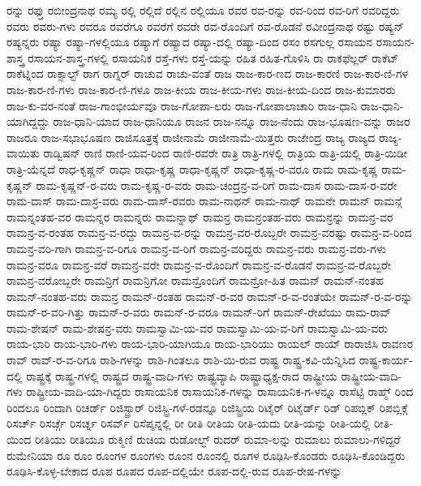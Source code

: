 {ರನ್ನು
ರಫ್ತು
ರಬೀಂದ್ರನಾಥ
ರಮ್ಯ
ರಲ್ಲಿ
ರಲ್ಲಿದೆ
ರಲ್ಲಿನ
ರಲ್ಲಿಯೂ
ರವರ
ರವ-ರನ್ನು
ರವ-ರಿಂದ
ರವ-ರಿಗೆ
ರವರಿದ್ದರು
ರವರು
ರವರು-ಗಳು
ರವರೂ
ರವರೆಗೂ
ರವರೆಗೆ
ರವರೇ
ರವ-ರೊಂದಿಗೆ
ರವ-ರೊಡನೆ
ರವೀಂದ್ರನಾಥ
ರಷ್ಟು
ರಷ್ಯನ್
ರಷ್ಯನ್ನರು
ರಷ್ಯಾ
ರಷ್ಯಾ-ಗಳಲ್ಲಿಯೂ
ರಷ್ಯಾಗೆ
ರಷ್ಯಾದ
ರಷ್ಯಾ-ದಲ್ಲಿ
ರಷ್ಯಾ-ದಿಂದ
ರಸಂ
ರಸಗುಲ್ಲ
ರಸಾಯನ
ರಸಾಯನ-ಶಾಸ್ತ್ರ
ರಸಾಯನ-ಶಾಸ್ತ್ರ-ಗಳಲ್ಲಿ
ರಸಾಯನಿಕ
ರಸ್ತೆ-ಗಳು
ರಸ್ತೆ-ಯನ್ನು
ರಹಿತ
ರಹಿತ-ಗೊಳಿಸಿ
ರಾ
ರಾಕಫೆಲ್ಲರ್
ರಾಕೆಟ್
ರಾಕೆಟ್ನಿಂದ
ರಾಕ್ಸಾಲ್ಟ್
ರಾಗ
ರಾಗ್ನರ್
ರಾಚುವ
ರಾಚು-ವಂತೆ
ರಾಜ
ರಾಜ-ಕಾರ-ಣದ
ರಾಜ-ಕಾರಣಿ
ರಾಜ-ಕಾರ-ಣಿ-ಗಳ
ರಾಜ-ಕಾರ-ಣಿ-ಗಳು
ರಾಜ-ಕಾರ-ಣಿ-ಗಳೂ
ರಾಜ-ಕೀಯ
ರಾಜ-ಕೀಯ-ಗಳು
ರಾಜ-ಕೀಯ-ದಿಂದ
ರಾಜ-ಕುಮಾರರು
ರಾಜ-ಕು-ವರ-ನಂತೆ
ರಾಜ-ಗಾಂಭೀರ್ಯವೂ
ರಾಜ-ಗೋಪಾ-ಲರು
ರಾಜ-ಗೋಪಾಲಾಚಾರಿ
ರಾಜ-ಧಾನಿ
ರಾಜ-ಧಾನಿ-ಯಾಗಿದ್ದದ್ದು
ರಾಜ-ಧಾನಿ-ಯಾದ
ರಾಜ-ಧಾನಿಯೂ
ರಾಜನ
ರಾಜ-ನನ್ನೂ
ರಾಜ-ನೆಂದು
ರಾಜ-ಭೂಷಣ-ವನ್ನು
ರಾಜರ
ರಾಜರೂ
ರಾಜ-ಸಭಾಭೂಷಣ
ರಾಜಿಸೂತ್ರಕ್ಕೆ
ರಾಜೀನಾಮೆ
ರಾಜೀನಾಮೆ-ಯಿತ್ತರು
ರಾಜೇಂದ್ರ
ರಾಜ್ಯ
ರಾಜ್ಯದ
ರಾಜ್ಯ-ವಾಯಿತು
ರಾಡ್ವಿಷನ್
ರಾಣಿ
ರಾಣಿ-ಯವ-ರಿಂದ
ರಾಣಿ-ರವರೇ
ರಾತ್ರಿ
ರಾತ್ರಿ-ಗಳಲ್ಲಿ
ರಾತ್ರಿಯ
ರಾತ್ರಿ-ಯಲ್ಲಿ
ರಾತ್ರಿ-ಯಿಡೀ
ರಾತ್ರಿ-ಯೆನ್ನದೆ
ರಾಧ-ಕೃಷ್ಣನ್
ರಾಧಾ
ರಾಧಾ-ಕೃಷ್ಣ
ರಾಧಾ-ಕೃಷ್ಣನ್
ರಾಧಾ-ಕೃಷ್ಣ-ರ-ವರೂ
ರಾಮ
ರಾಮ-ಕೃಷ್ಣ
ರಾಮ-ಕೃಷ್ಣನ್
ರಾಮ-ಕೃಷ್ಣನ್-ರ-ವರು
ರಾಮ-ಕೃಷ್ಣ-ರ-ವರು
ರಾಮ-ಚಂದ್ರನ್ರ-ವ-ರಿಗೆ
ರಾಮ-ದಾಸ
ರಾಮ-ದಾಸ-ರ-ವರೇ
ರಾಮ-ದಾಸ್
ರಾಮ-ದಾಸ್ರ-ವರು
ರಾಮ-ದಾಸ್-ರವರು
ರಾಮ-ನಾಥನ್
ರಾಮ-ನಾಥ್
ರಾಮನೇ
ರಾಮನ್
ರಾಮನ್ಗೆ
ರಾಮನ್ನಂತಹ-ವರ
ರಾಮನ್ನರ
ರಾಮನ್ನರು
ರಾಮನ್ನಾಥ್
ರಾಮನ್ರ
ರಾಮನ್ರಂತಹ-ವರು
ರಾಮನ್ರನ್ನು
ರಾಮನ್ರ-ವರ
ರಾಮನ್ರ-ವ-ರಂತಹ
ರಾಮನ್ರ-ವ-ರದ್ದು
ರಾಮನ್ರ-ವ-ರನ್ನು
ರಾಮನ್ರ-ವರ-ರೊಬ್ಬರೇ
ರಾಮನ್ರ-ವರಷ್ಟು
ರಾಮನ್ರ-ವ-ರಿಂದ
ರಾಮನ್ರ-ವರಿ-ಗಾಗಿ
ರಾಮನ್ರ-ವ-ರಿಗೂ
ರಾಮನ್ರ-ವ-ರಿಗೆ
ರಾಮನ್ರ-ವರಿದ್ದರು
ರಾಮನ್ರ-ವರು
ರಾಮನ್ರ-ವರು-ಗಳು
ರಾಮನ್ರ-ವರೂ
ರಾಮನ್ರ-ವರೆ
ರಾಮನ್ರ-ವರೇ
ರಾಮನ್ರ-ವ-ರೊಂದಿಗೆ
ರಾಮನ್ರ-ವ-ರೊಡನೆ
ರಾಮನ್ರ-ವ-ರೊಬ್ಬರೇ
ರಾಮನ್ರ-ವರೋಬ್ಬರೇ
ರಾಮನ್ರಿಗೆ
ರಾಮನ್ರಿಗೋ
ರಾಮನ್ರೊಂದಿಗೆ
ರಾಮನ್ರೋ-ಹಿತ
ರಾಮನ್
ರಾಮನ್-ನಂತಹ
ರಾಮನ್-ನಂತಹ-ವರು
ರಾಮನ್ರ
ರಾಮನ್-ರಂತಹ
ರಾಮನ್-ರ-ವರ
ರಾಮನ್-ರ-ವ-ರಂತೆಯೇ
ರಾಮನ್-ರ-ವ-ರನ್ನು
ರಾಮನ್-ರ-ವರಿ-ಗಿತ್ತು
ರಾಮನ್-ರ-ವರು
ರಾಮನ್-ರ-ವರೂ
ರಾಮನ್-ರಿಗೆ
ರಾಮನ್-ರೇಖೆಯು
ರಾಮ-ರಾವ್
ರಾಮ-ಶೇಷನ್
ರಾಮ-ಶೇಷನ್ರ-ವರು
ರಾಮಸ್ವಾಮಿ-ಯ-ವರ
ರಾಮಸ್ವಾಮಿ-ಯ-ವ-ರಿಗೆ
ರಾಮಸ್ವಾಮಿ-ಯ-ವರು
ರಾಯ-ಭಾರಿ
ರಾಯ-ಭಾರಿ-ಗಳು
ರಾಯ-ಭಾರಿ-ಯಾಗಿಯೂ
ರಾಯ-ಭಾರಿಯು
ರಾಯಲ್
ರಾಯ್
ರಾರಾಜಿಸಿ
ರಾವಣರ
ರಾವ್
ರಾವ್-ರ-ವ-ರಿಗೂ
ರಾಶಿ-ಗಳನ್ನು
ರಾಶಿ-ಗಿಂತಲೂ
ರಾಶಿ-ಯಿ-ರುವ
ರಾಷ್ಟ್ರ
ರಾಷ್ಟ್ರ-ಕವಿ-ಯೆನ್ನಿಸಿದ
ರಾಷ್ಟ್ರ-ಕಾರ್ಯ-ದಲ್ಲಿ
ರಾಷ್ಟ್ರಕ್ಕೆ
ರಾಷ್ಟ್ರ-ಗಳಲ್ಲಿ
ರಾಷ್ಟ್ರದ
ರಾಷ್ಟ್ರ-ವಾದಿ-ಗಳು
ರಾಷ್ಟ್ರವ್ಯಾಪಿ
ರಾಷ್ಟ್ರಾಧ್ಯಕ್ಷ-ರಾದ
ರಾಷ್ಟ್ರೀಯ
ರಾಷ್ಟ್ರೀಯ-ವಾದಿ-ಗಳು
ರಾಷ್ಟ್ರೀಯ-ವಾದಿ-ಯಾ-ಗಿದ್ದರು
ರಾಸಾಯನಿಕ
ರಾಸಾಯನಿಕ-ಗಳನ್ನು
ರಾಸಾಯನಿಕ-ಗ-ಳನ್ನೂ
ರಾಸೆಟ್ಟಿ
ರಾಹ್ಮ್
ರಿಂದ
ರಿಂದಲೂ
ರಿಂದಾಗಿ
ರಿಚರ್ಡ್
ರಿಜಿಸ್ಟ್ರಾರ್
ರಿಜಿಸ್ಟ್ರಿ-ಗಳೆ-ರಡನ್ನೂ
ರಿಜಿಸ್ಟ್ರಿಯ
ರಿಟೈರ್
ರಿಟೈರ್ಡ್
ರಿಡ್
ರಿಪಬ್ಲಿಕ್
ರಿಪಬ್ಲಿಕ್ಗೆ
ರಿಸರ್ಚ್
ರಿಸರ್ಚ್ಗೆ
ರಿಸರ್ಚ್ನ
ರಿಸರ್ವ್
ರಿಸೆಪ್ಶನ್ನಲ್ಲಿ
ರೀ
ರೀತಿ
ರೀತಿಯ
ರೀತಿ-ಯದು
ರೀತಿ-ಯನ್ನು
ರೀತಿ-ಯಲ್ಲಿ
ರೀತಿ-ಯಿಂದ
ರೀತಿಯು
ರೀತಿಯೂ
ರುಕ್ಮಿಣಿ
ರುಚಿಯ
ರುಡೋಲ್ಭ್
ರುದರ್
ರುಮಾ-ಲನ್ನು
ರುಮಾಲು
ರುಮಾಲು-ಗಳಿದ್ದರೆ
ರುಮೇನಿಯಾ
ರೂ
ರೂಂ
ರೂಂಗಳ
ರೂಂಗಳು
ರೂಂನ
ರೂಂನಲ್ಲಿ
ರೂಗಳ
ರೂಢಿಸಿ-ಕೊಂಡರು
ರೂಢಿಸಿ-ಕೊಂಡಿದ್ದರು
ರೂಢಿಸಿ-ಕೊಳ್ಳ-ಬೇಕಾದ
ರೂಪ
ರೂಪದ
ರೂಪ-ದಲ್ಲಿಯೇ
ರೂಪ-ದಲ್ಲಿ-ರುವ
ರೂಪ-ರೇಷ-ಗಳನ್ನು
}

